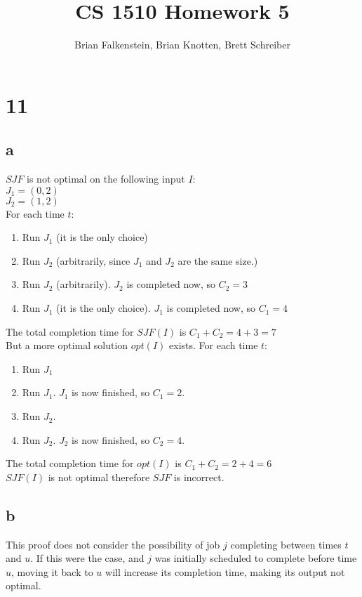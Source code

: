 \documentclass[letterpaper,notitlepage,twoside]{article}
\title{CS 1510 Homework 5}
\author{Brian Falkenstein, Brian Knotten, Brett Schreiber}
\begin{document}
\maketitle

\section*{11}
\subsection*{a}
$SJF$ is not optimal on the following input $I$:\\
$J_1 = (0, 2)$\\
$J_2 = (1, 2)$\\
For each time $t$:
\begin{enumerate}
\item Run $J_1$ (it is the only choice)
\item Run $J_2$ (arbitrarily, since $J_1$ and $J_2$ are the same size.)
\item Run $J_2$ (arbitrarily). $J_2$ is completed now, so $C_2 = 3$
\item Run $J_1$ (it is the only choice). $J_1$ is completed now, so $C_1 = 4$
\end{enumerate}
The total completion time for $SJF(I)$ is $C_1 + C_2 = 4 + 3 = 7$\\
But a more optimal solution $opt(I)$ exists. For each time $t$:
\begin{enumerate}
\item Run $J_1$
\item Run $J_1$. $J_1$ is now finished, so $C_1 = 2$.
\item Run $J_2$.
\item Run $J_2$. $J_2$ is now finished, so $C_2 = 4$.
\end{enumerate}
The total completion time for $opt(I)$ is $C_1 + C_2 = 2 + 4 = 6$\\
$SJF(I)$ is not optimal therefore $SJF$ is incorrect.

\subsection*{b}
This proof does not consider the possibility of job $j$ completing between times $t$ and $u$. If this were the case, and $j$ was initially scheduled to complete before time $u$, moving it back to $u$ will increase its completion time, making its output not optimal. 
\end{document}
